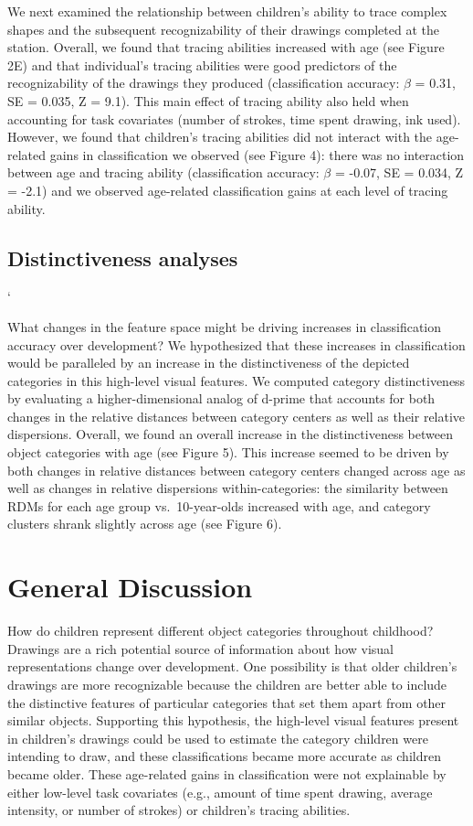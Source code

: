 \documentclass[10pt, letterpaper]{article}
\begin{document}
We next examined the relationship between children's ability to trace
complex shapes and the subsequent recognizability of their drawings
completed at the station. Overall, we found that tracing abilities
increased with age (see Figure 2E) and that individual's tracing
abilities were good predictors of the recognizability of the drawings
they produced (classification accuracy: \(\beta\) = 0.31, SE = 0.035, Z
= 9.1). This main effect of tracing ability also held when accounting
for task covariates (number of strokes, time spent drawing, ink used).
However, we found that children's tracing abilities did not interact
with the age-related gains in classification we observed (see Figure 4):
there was no interaction between age and tracing ability (classification
accuracy: \(\beta\) = -0.07, SE = 0.034, Z = -2.1) and we observed
age-related classification gains at each level of tracing ability.

\subsection{Distinctiveness analyses}\label{distinctiveness-analyses-1}

`

What changes in the feature space might be driving increases in
classification accuracy over development? We hypothesized that these
increases in classification would be paralleled by an increase in the
distinctiveness of the depicted categories in this high-level visual
features. We computed category distinctiveness by evaluating a
higher-dimensional analog of d-prime that accounts for both changes in
the relative distances between category centers as well as their
relative dispersions. Overall, we found an overall increase in the
distinctiveness between object categories with age (see Figure 5). This
increase seemed to be driven by both changes in relative distances
between category centers changed across age as well as changes in
relative dispersions within-categories: the similarity between RDMs for
each age group vs.~10-year-olds increased with age, and category
clusters shrank slightly across age (see Figure 6).

\section{General Discussion}\label{general-discussion}

How do children represent different object categories throughout
childhood? Drawings are a rich potential source of information about how
visual representations change over development. One possibility is that
older children's drawings are more recognizable because the children are
better able to include the distinctive features of particular categories
that set them apart from other similar objects. Supporting this
hypothesis, the high-level visual features present in children's
drawings could be used to estimate the category children were intending
to draw, and these classifications became more accurate as children
became older. These age-related gains in classification were not
explainable by either low-level task covariates (e.g., amount of time
spent drawing, average intensity, or number of strokes) or children's
tracing abilities.
\end{document}
